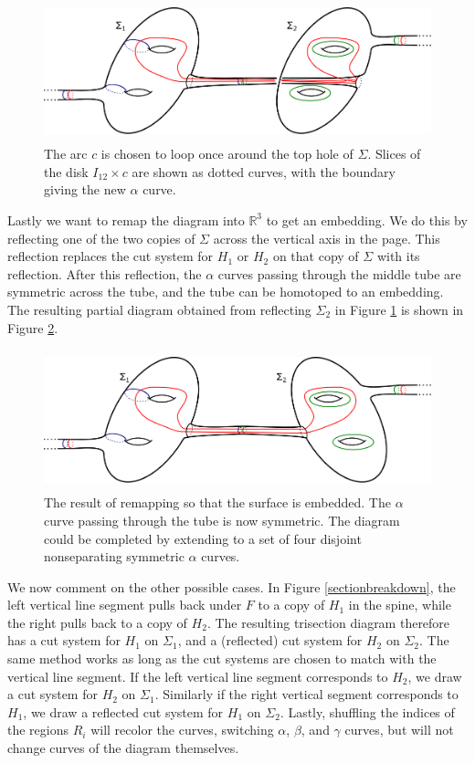 \documentclass[12pt]{amsart}
\newcommand{\R}{\mathbb{R}}
\theoremstyle{definition}
\theoremstyle{remark}
\begin{document}
\begin{figure}[h]
\centering
\includegraphics[height=1.6in]{coresubsurfacediagram.png}
\caption{The arc $c$ is chosen to loop once around the top hole of $\Sigma$.
Slices of the disk $I_{12} \times c$ are shown as dotted curves, with the boundary giving the new $\alpha$ curve.}
\label{fig_coresubsurfacediagram}
\end{figure}

Lastly we want to remap the diagram into $\R^3$ to get an embedding.
We do this by reflecting one of the two copies of $\Sigma$ across the vertical axis in the page.
This reflection replaces the cut system for $H_1$ or $H_2$ on that copy of $\Sigma$ with its reflection.
After this reflection, the $\alpha$ curves passing through the middle tube are symmetric across the tube, and the tube can be homotoped to an embedding.
The resulting partial diagram obtained from reflecting $\Sigma_2$ in Figure \ref{fig_coresubsurfacediagram} is shown in Figure \ref{fig_coresubsurfacediagram_embedded}.

\begin{figure}[h]
\centering
\includegraphics[height=1.6in]{coresubsurfacediagram_embedded.png}
\caption{The result of remapping so that the surface is embedded.
The $\alpha$ curve passing through the tube is now symmetric.
The diagram could be completed by extending to a set of four disjoint nonseparating symmetric $\alpha$ curves.}
\label{fig_coresubsurfacediagram_embedded}
\end{figure}

We now comment on the other possible cases.
In Figure \ref{sectionbreakdown}, the left vertical line segment pulls back under $F$ to a copy of $H_1$ in the spine, while the right pulls back to a copy of $H_2$.
The resulting trisection diagram therefore has a cut system for $H_1$ on $\Sigma_1$, and a (reflected) cut system for $H_2$ on $\Sigma_2$.
The same method works as long as the cut systems are chosen to match with the vertical line segment.
If the left vertical line segment corresponds to $H_2$, we draw a cut system for $H_2$ on $\Sigma_1$.
Similarly if the right vertical segment corresponds to $H_1$, we draw a reflected cut system for $H_1$ on $\Sigma_2$.
Lastly, shuffling the indices of the regions $R_i$ will recolor the curves, switching $\alpha$, $\beta$, and $\gamma$ curves, but will not change curves of the diagram themselves.
\end{document}
